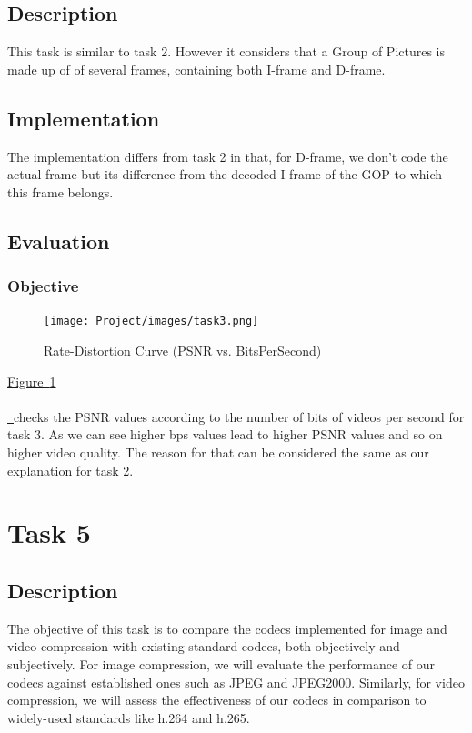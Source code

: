 \documentclass{article}
\newcommand*{\figref}[2][]{%
  \hyperref[{fig:#2}]{%
    Figure~\ref*{fig:#2}%
    \ifx\\#1\\%
    \else
      \,#1%
    \fi
  }%
}
\begin{document}
\subsection{Description}

This task is similar to task 2. However it considers that a Group of Pictures is made up of of several frames, containing both I-frame and D-frame.

\subsection{Implementation}

The implementation differs from task 2 in that, for D-frame, we don't code the actual frame but its difference from the decoded I-frame of the GOP to which this frame belongs.


\subsection{Evaluation}
\subsubsection{Objective}

\begin{figure}[H]
  \centering
  \texttt{[image: Project/images/task3.png]}
  \caption{Rate-Distortion Curve (PSNR vs. BitsPerSecond)}
  \label{fig:task3}
\end{figure}

\figref{task3} checks the PSNR values according to the number of bits of videos per second for task 3. As we can see higher bps values lead to higher PSNR values and so on higher video quality. The reason for that can be considered the same as our explanation for task 2.


\section{Task 5}
\subsection{Description}

The objective of this task is to compare the codecs implemented for image and video compression with existing standard codecs, both objectively and subjectively. For image compression, we will evaluate the performance of our codecs against established ones such as JPEG and JPEG2000. Similarly, for video compression, we will assess the effectiveness of our codecs in comparison to widely-used standards like h.264 and h.265. 
\end{document}
